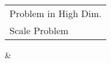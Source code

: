 \documentclass[10pt,journal,compsoc]{IEEEtran}
\begin{document}
\begin{tabular}[c]{@{}l@{}}Problem in High Dim.\\ Scale Problem\end{tabular} &                                                          \\  %
\end{document}
